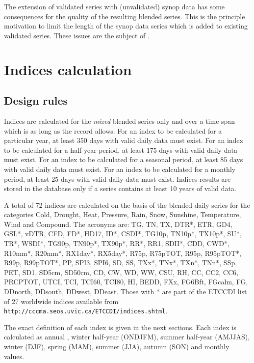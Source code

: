 \documentclass[a4paper,11pt]{article}
\begin{document}
The extension of validated series with (unvalidated) synop data has
some consequences for the quality of the resulting blended series. This
is the principle motivation to limit the length of the synop data series 
which is added to existing validated series. These issues are the subject
of \citet{vandenbesselaar:12}.


\section{Indices calculation}
\label{sec:indices}

\subsection{Design rules}
\label{sec:indicesrules}

Indices are calculated for the \emph{mixed} blended series only and
over a time span which is as long as the record allows.
For an index to be calculated for a
particular year, at least 350 days with valid daily data must
exist. For an index to be calculated for a half-year period, at least
175 days with valid daily data must exist. For an index to be
calculated for a seasonal period, at least 85 days with valid daily
data must exist. For an index to be
calculated for a monthly period, at least 25 days with valid daily
data must exist. Indices results are stored in the database only if a
series contains at least 10 years of valid data. 

A total of 72 indices are calculated on the basis of the blended daily
series for the categories Cold, Drought, Heat, Pressure, Rain, Snow,
Sunshine, Temperature, Wind and Compound. The acronyms are: 
 TG, TN, TX, DTR*, ETR, GD4, GSL*, vDTR, CFD, FD*, HD17, ID*, CSDI*, TG10p, TN10p*, TX10p*, SU*, TR*,
 WSDI*, TG90p, TN90p*, TX90p*, RR*, RR1, SDII*, CDD, CWD*, R10mm*, R20mm*, RX1day*, RX5day*, R75p, R75pTOT,
 R95p, R95pTOT*, R99p, R99pTOT*, PP, SPI3, SPI6, SD, SS, TXx*, TNx*, TXn*, TNn*, SSp, PET, SD1, SD5cm, SD50cm,
 CD, CW, WD, WW, CSU, RH, CC, CC2, CC6, PRCPTOT, UTCI, TCI, TCI60, TCI80, HI, BEDD,
FXx, FG6Bft, FGcalm, FG, DDnorth, DDsouth, DDwest, DDeast. 
Those with * are part of the ETCCDI list of 27 worldwide indices
available from {\tt http://cccma.seos.uvic.ca/ETCCDI/indices.shtml}.

The exact definition of each index is given in the next sections. Each
index is calculated as annual , winter half-year (ONDJFM), summer
half-year (AMJJAS), winter (DJF), spring (MAM), summer (JJA), autumn
(SON) and monthly values.
\end{document}
